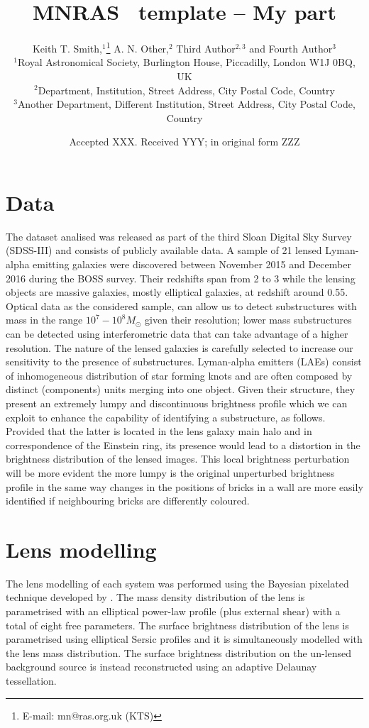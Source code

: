 \documentclass[a4paper,fleqn,usenatbib]{mnras}
\title[Short title, max. 45 characters]{MNRAS \LaTeXe\ template -- My part}
\author[E. Ritondale et al.]{
Keith T. Smith,$^{1}$\thanks{E-mail: mn@ras.org.uk (KTS)}
A. N. Other,$^{2}$
Third Author$^{2,3}$
and Fourth Author$^{3}$
\\
$^{1}$Royal Astronomical Society, Burlington House, Piccadilly, London W1J 0BQ, UK\\
$^{2}$Department, Institution, Street Address, City Postal Code, Country\\
$^{3}$Another Department, Different Institution, Street Address, City Postal Code, Country
}
\date{Accepted XXX. Received YYY; in original form ZZZ}
\begin{document}
\label{firstpage}
\pagerange{\pageref{firstpage}--\pageref{lastpage}}
\maketitle



\section{Data}
The dataset analised was released as part of the third Sloan Digital Sky Survey (SDSS-III) and consists of publicly available data. A sample of 21 lensed Lyman-alpha emitting galaxies were discovered between November 2015 and December 2016 during the BOSS survey. Their redshifts span from 2 to 3 while the lensing objects are massive galaxies, mostly elliptical galaxies, at redshift around 0.55.
Optical data as the considered sample, can allow us to detect substructures with mass in the range $10^7 - 10^8 M_{\odot}$ given their resolution; lower mass substructures can be detected using interferometric data that can take advantage of a higher resolution.
The nature of the lensed galaxies is carefully selected to increase our sensitivity to the presence of substructures. Lyman-alpha emitters (LAEs) consist of inhomogeneous distribution of star forming knots and are often composed by distinct (components) units merging into one object. Given their structure, they present an extremely lumpy and discontinuous brightness profile which we can exploit to enhance the capability of identifying a substructure, as follows. Provided that the latter is located in the lens galaxy main halo and in correspondence of the Einstein ring, its presence would lead to a distortion in the brightness distribution of the lensed images. This local brightness perturbation will be more evident the more lumpy is the original unperturbed brightness profile in the same way changes in the positions of bricks in a wall are more easily identified if neighbouring bricks are differently coloured.

\section{Lens modelling}
The lens modelling of each system was performed using the Bayesian pixelated technique developed by \citet{method} \citep[see also][]{Vegetti+14}.
The mass density distribution of the lens is parametrised with an elliptical power-law profile (plus external shear) with a total of eight free parameters. The surface brightness distribution of the lens is parametrised using elliptical Sersic profiles and it is simultaneously modelled with the lens mass distribution. The surface brightness distribution on the un-lensed background source is instead reconstructed using an adaptive Delaunay tessellation.
\end{document}
